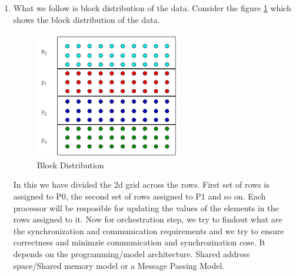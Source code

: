 \documentclass[12pt]{article}
\begin{document}
\begin{enumerate}
\item What we follow is block distribution of the data. Consider the figure \ref{fig:block} which shows the block distribution of the data.
\begin{figure}[H]
    \centering
    \includegraphics[width=0.6\textwidth]{images/block.png}
    \caption{Block Distribution}
    \label{fig:block}
\end{figure}
In this we have divided the 2d grid across the rows. First set of rows is assigned to P0, the second set of rows assigned to P1 and so on. Each processor will be resposible 
for updating the values of the elements in the rows assigned to it. Now for orchestration step, we try to findout what are the synchronization and communication requirements and we try to ensure correctness and minimzie communication and synchrozination cose.
It depends on the programming/model architecture. Shared address space/Shared memory model or a Message Passing Model. 
\end{enumerate}
\end{document}
